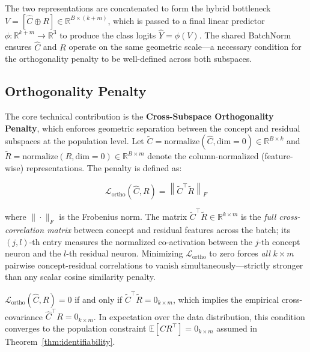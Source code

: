 \documentclass[twoside,11pt]{article}
\begin{document}
The two representations are concatenated to form the hybrid bottleneck $V = [\hat{C} \oplus R] \in \mathbb{R}^{B \times (k+m)}$, which is passed to a final linear predictor $\phi: \mathbb{R}^{k+m} \rightarrow \mathbb{R}^{3}$ to produce the class logits $\hat{Y} = \phi(V)$. The shared BatchNorm ensures $\hat{C}$ and $R$ operate on the same geometric scale---a necessary condition for the orthogonality penalty to be well-defined across both subspaces.

\subsection{Orthogonality Penalty}

The core technical contribution is the \textbf{Cross-Subspace Orthogonality Penalty}, which enforces geometric separation between the concept and residual subspaces at the population level. Let $\tilde{C} = \text{normalize}(\hat{C}, \text{dim}=0) \in \mathbb{R}^{B \times k}$ and $\tilde{R} = \text{normalize}(R, \text{dim}=0) \in \mathbb{R}^{B \times m}$ denote the column-normalized (feature-wise) representations. The penalty is defined as:

\begin{equation}
    \mathcal{L}_{\text{ortho}}(\hat{C}, R) = \left\| \tilde{C}^\top \tilde{R} \right\|_F
    \label{eq:ortho}
\end{equation}

where $\|\cdot\|_F$ is the Frobenius norm. The matrix $\tilde{C}^\top \tilde{R} \in \mathbb{R}^{k \times m}$ is the \textit{full cross-correlation matrix} between concept and residual features across the batch; its $(j, l)$-th entry measures the normalized co-activation between the $j$-th concept neuron and the $l$-th residual neuron. Minimizing $\mathcal{L}_{\text{ortho}}$ to zero forces \textit{all} $k \times m$ pairwise concept-residual correlations to vanish simultaneously---strictly stronger than any scalar cosine similarity penalty.

\begin{proposition}
\label{prop:equivalence}
$\mathcal{L}_{\text{ortho}}(\hat{C}, R) = 0$ if and only if $\tilde{C}^\top \tilde{R} = 0_{k \times m}$, which implies the empirical cross-covariance $\hat{C}^\top R = 0_{k \times m}$. In expectation over the data distribution, this condition converges to the population constraint $\mathbb{E}[C R^\top] = 0_{k \times m}$ assumed in Theorem~\ref{thm:identifiability}.
\end{proposition}
\end{document}
